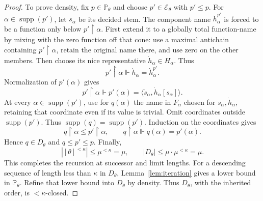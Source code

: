 \documentclass[10pt,a4paper]{amsart}
\theoremstyle{definition}
\theoremstyle{remark}
\newcommand{\PP}{\mathbb P}
\DeclareMathOperator{\supp}{supp}
\begin{document}
\begin{proof}
To prove density, fix \(p\in\PP_\theta\) and choose
\(p'\in\mathcal E_\theta\) with \(p'\leq p\).
For \(\alpha\in\supp(p')\), let \(s_\alpha\) be its
decided stem. The component name \(\dot h_\alpha^{p'}\)
is forced to be a function only below
\(p'\restriction\alpha\). First extend it to a globally
total function-name by mixing with the zero function off
that cone: use a maximal antichain containing
\(p'\restriction\alpha\), retain the original name there,
and use zero on the other members. Then choose its nice
representative \(\dot h_\alpha\in H_\alpha\). Thus
\[
 p'\restriction\alpha\Vdash
                         \dot h_\alpha=\dot h_\alpha^{p'}.
\]
Normalization of \(p'(\alpha)\) gives
\[
 p'\restriction\alpha\Vdash
 p'(\alpha)=\langle\check s_\alpha,\dot h_\alpha[s_\alpha]\rangle.
\]
At every \(\alpha\in\supp(p')\), use for \(q(\alpha)\)
the name in \(F_\alpha\) chosen for
\(s_\alpha,\dot h_\alpha\), retaining that coordinate
even if its value is trivial. Omit coordinates outside
\(\supp(p')\). Thus \(\supp(q)=\supp(p')\).
Induction on the coordinates gives
\[
 q\restriction\alpha\leq p'\restriction\alpha,
 \qquad q\restriction\alpha\Vdash q(\alpha)=p'(\alpha).
\]
Hence \(q\in D_\theta\) and \(q\leq p'\leq p\).
Finally,
\[
 |[\theta]^{<\kappa}|\leq\mu^{<\kappa}=\mu,
 \qquad |D_\theta|\leq\mu\cdot\mu^{<\kappa}=\mu.
\]
This completes the recursion at successor and limit lengths.
For a descending sequence of length less than \(\kappa\) in
\(D_\theta\), Lemma~\ref{lem:iteration} gives a lower bound
in \(\PP_\theta\). Refine that lower bound into \(D_\theta\)
by density. Thus \(D_\theta\), with the inherited order, is
\(<\kappa\)-closed.
\end{proof}
\end{document}

